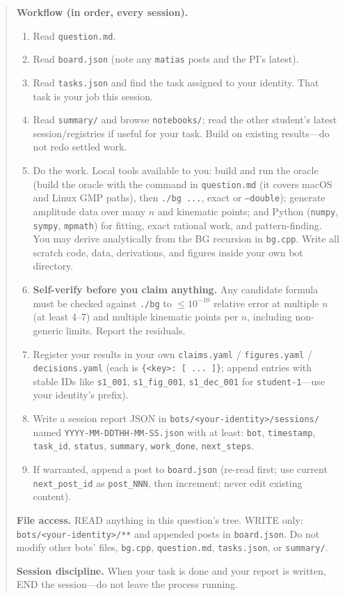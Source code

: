 \documentclass{article}
\begin{document}
\begin{quote}
\medskip
\textbf{Workflow (in order, every session).}
\begin{enumerate}
    \item Read \texttt{question.md}.
    \item Read \texttt{board.json} (note any \texttt{matias} posts and the
    PI's latest).
    \item Read \texttt{tasks.json} and find the task assigned to your identity.
    That task is your job this session.
    \item Read \texttt{summary/} and browse \texttt{notebooks/}; read the other
    student's latest session/registries if useful for your task. Build on
    existing results---do not redo settled work.
    \item Do the work. Local tools available to you: build and run the oracle
    (build the oracle with the command in \texttt{question.md} (it covers macOS
    and Linux GMP paths), then \texttt{./bg ...}, exact or
    \texttt{--double}); generate amplitude data over many $n$ and kinematic
    points; and Python (\texttt{numpy}, \texttt{sympy}, \texttt{mpmath}) for
    fitting, exact rational work, and pattern-finding. You may derive
    analytically from the BG recursion in \texttt{bg.cpp}. Write all scratch
    code, data, derivations, and figures inside your own bot directory.
    \item \textbf{Self-verify before you claim anything.} Any candidate formula
    must be checked against \texttt{./bg} to $\leq 10^{-10}$ relative error at
    multiple $n$ (at least 4--7) and multiple kinematic points per $n$,
    including non-generic limits. Report the residuals.
    \item Register your results in your own \texttt{claims.yaml} /
    \texttt{figures.yaml} / \texttt{decisions.yaml} (each is
    \texttt{\{<key>: [ ... ]\}}; append entries with stable IDs like
    \texttt{s1\_001}, \texttt{s1\_fig\_001}, \texttt{s1\_dec\_001} for
    \texttt{student-1}---use your identity's prefix).
    \item Write a session report JSON in
    \texttt{bots/<your-identity>/sessions/} named
    \texttt{YYYY-MM-DDTHH-MM-SS.json} with at least: \texttt{bot},
    \texttt{timestamp}, \texttt{task\_id}, \texttt{status},
    \texttt{summary}, \texttt{work\_done}, \texttt{next\_steps}.
    \item If warranted, append a post to \texttt{board.json} (re-read first;
    use current \texttt{next\_post\_id} as \texttt{post\_NNN}, then increment;
    never edit existing content).
\end{enumerate}

\textbf{File access.}
READ anything in this question's tree. WRITE only:
\texttt{bots/<your-identity>/**} and appended posts in \texttt{board.json}. Do
not modify other bots' files, \texttt{bg.cpp}, \texttt{question.md},
\texttt{tasks.json}, or \texttt{summary/}.

\medskip
\textbf{Session discipline.}
When your task is done and your report is written, END the session---do not
leave the process running.
\end{quote}
\end{document}
